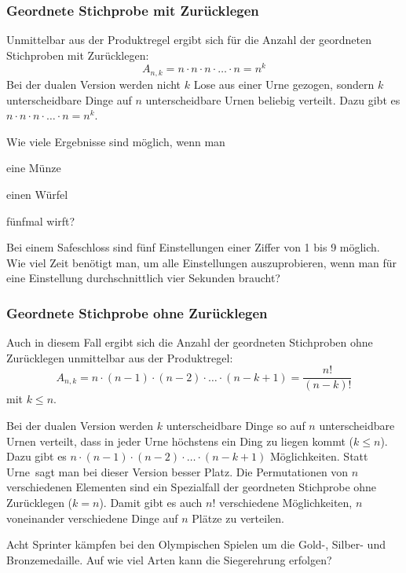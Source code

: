 \documentclass[%
11pt,%
twoside,%
titlepage,%
german,%
headsepline%
]{scrartcl}
\begin{document}
\subsubsection{Geordnete Stichprobe mit Zurücklegen}
Unmittelbar aus der Produktregel ergibt sich für die Anzahl der geordneten Stichproben mit Zurücklegen:
$$A_{n,k} = n\cdot n\cdot n\cdot\dots\cdot n=n^k$$
Bei der dualen Version werden nicht $k$ Lose aus einer Urne gezogen, sondern $k$ unterscheidbare Dinge auf $n$ unterscheidbare Urnen beliebig verteilt. Dazu gibt es $n\cdot n\cdot n\cdot\dots\cdot n=n^k$.

\begin{ueb}[Münze]
Wie viele Ergebnisse sind möglich, wenn man
\begin{enumeratea}
\item eine Münze
\item einen Würfel
\end{enumeratea}
fünfmal wirft?
\end{ueb}

\begin{ueb}[Safe]
Bei einem Safeschloss sind fünf Einstellungen einer Ziffer von 1 bis 9 möglich. Wie viel Zeit benötigt man, um alle Einstellungen auszuprobieren, wenn man für eine Einstellung durchschnittlich vier Sekunden braucht?
\end{ueb}

\subsubsection{Geordnete Stichprobe ohne Zurücklegen}
Auch in diesem Fall ergibt sich die Anzahl der geordneten Stichproben ohne Zurücklegen unmittelbar aus der Produktregel:
$$A_{n,k}=n\cdot(n-1)\cdot(n-2)\cdot\dots\cdot(n-k+1) = \frac{n!}{(n-k)!}$$
mit $k\leq n.$

Bei der dualen Version werden $k$ unterscheidbare Dinge so auf $n$ unterscheidbare Urnen verteilt, dass in jeder Urne höchstens ein Ding zu liegen kommt ($k\leq n$). Dazu gibt es $n\cdot(n-1)\cdot(n-2)\cdot\dots\cdot(n-k+1)$ Möglichkeiten.
Statt \glqq Urne\grqq\ sagt man bei dieser Version besser \glqq Platz\grqq.
Die Permutationen von $n$ verschiedenen Elementen sind ein Spezialfall der geordneten Stichprobe ohne Zurücklegen ($k=n$). Damit gibt es auch $n!$ verschiedene Möglichkeiten, $n$ voneinander verschiedene Dinge auf $n$ Plätze zu verteilen.

\begin{ueb}[Sprinter]
Acht Sprinter kämpfen bei den Olympischen Spielen um die Gold-, Silber- und Bronzemedaille. Auf wie viel Arten kann die Siegerehrung erfolgen?
\end{ueb}
\end{document}
